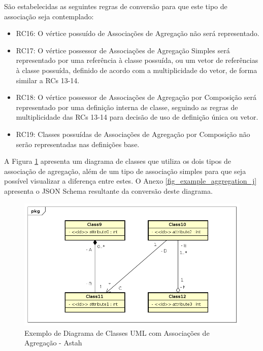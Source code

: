 São estabelecidas as seguintes regras de conversão para que este tipo de associação seja contemplado:

\begin{itemize}
    \item RC16: O vértice possuído de Associações de Agregação não será representado.

    \item RC17: O vértice possessor de Associações de Agregação Simples será representado por uma referência à classe possuída, ou um vetor de referências à classe possuída, definido de acordo com a multiplicidade do vetor, de forma similar a RCs 13-14.

    \item RC18: O vértice possessor de Associações de Agregação por Composição será representado por uma definição interna de classe, seguindo as regras de multiplicidade das RCs 13-14 para decisão de uso de definição única ou vetor.

    \item RC19: Classes possuídas de Associações de Agregação por Composição não serão representadas nas definições base.
\end{itemize}

A Figura \ref{fig_example_aggregation} apresenta um diagrama de classes que utiliza os dois tipos de associação de agregação, além de um tipo de associação simples para que seja possível visualizar a diferença entre estes. O Anexo \ref{fig_example_aggregation_j} apresenta o JSON Schema resultante da conversão deste diagrama.

\begin{figure}
    \begin{center}
        \includegraphics[scale=0.7]{imagens/Example_Aggregation.png}
    \end{center}
	\caption{\label{fig_example_aggregation}Exemplo de Diagrama de Classes UML com Associações de Agregação - Astah}
\end{figure}

